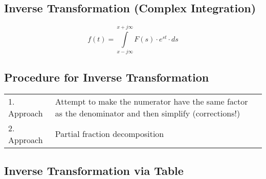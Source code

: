 		\subsection{Inverse Transformation (Complex Integration)}
			$$f(t)=\int\limits_{x-j\infty}^{x+j\infty}F(s) \cdot e^{st} \cdot ds$$


		\subsection{Procedure for Inverse Transformation}
		\begin{tabular}{ll}
  			1. Approach & Attempt to make the numerator have the same factor as the denominator
  			and then simplify (corrections!) \\
  			2. Approach & Partial fraction decomposition
		\end{tabular}

		\newpage

		\subsection{Inverse Transformation via Table}
			\begin{center}
				
			\end{center}
			\vfill


